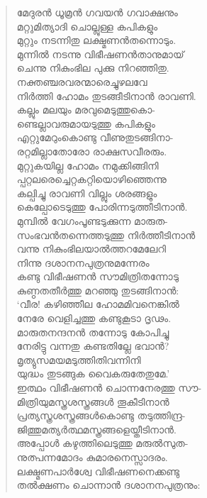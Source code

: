\begin{verse}
മേദുരന്‍ ധൂമ്രന്‍ ഗവയന്‍ ഗവാക്ഷനും\\
മറ്റുമിത്യാദി ചൊല്ലുള്ള കപികളും\\
മുറ്റും നടന്നിതു ലക്ഷ്മണന്‍തന്നൊടും.\\
മുന്നില്‍ നടന്നു വിഭീഷണന്‍താനുമായ്\\
ചെന്നു നികുംഭില പുക്കു നിറഞ്ഞിതു.\\
നക്തഞ്ചരവരന്മാരെച്ചുഴലവേ\\
നിര്‍ത്തി ഹോമം തുടങ്ങീടിനാന്‍ രാവണി.\\
കല്ലും മലയും മരവുമെടുത്തുകൊ-\\
ണ്ടെല്ലാവരുമായടുത്തു കപികളും\\
എറ്റുമേറുംകൊണ്ടു വീണുതുടങ്ങിനാ-\\
രറ്റമില്ലാതോരോ രാക്ഷസവീരരും.\\
മുറ്റുകയില്ല ഹോമം നമുക്കിങ്ങിനി\\
പ്പറ്റലരെച്ചെറ്റകറ്റിയൊഴിഞ്ഞെന്നു\\
കല്പിച്ചു രാവണി വില്ലും ശരങ്ങളും\\
കെല്പോടെടുത്തു പോരിന്നടുത്തീടിനാന്‍.\\
മുമ്പില്‍ വേഗംപൂണ്ടടുക്കുന്ന മാരുത-\\
സംഭവന്‍തന്നെത്തടുത്തു നിര്‍ത്തീടിനാന്‍\\
വന്നു നികുംഭിലയാല്‍ത്തറമേലേറി\\
നിന്നു ദശാനനപുത്രനുമന്നേരം\\
കണ്ടു വിഭീഷണന്‍ സൗമിത്രിതന്നോടു\\
കുണ്ഠതതീര്‍ത്തു മറഞ്ഞു തുടങ്ങിനാന്‍:\\
‘വീര! കഴിഞ്ഞീല ഹോമമിവനെങ്കില്‍\\
നേരേ വെളിച്ചത്തു കണ്ടുകൂടാ ദൃഢം.\\
മാരുതനന്ദനന്‍ തന്നോടു കോപിച്ചു\\
നേരിട്ടു വന്നതു കണ്ടതില്ലേ ഭവാന്‍?\\
മൃത്യുസമയമടുത്തിതിവന്നിനി\\
യുദ്ധം തുടങ്ങുക വൈകരുതേതുമേ.’\\
ഇത്ഥം വിഭീഷണന്‍ ചൊന്നനേരത്തു സൗ-\\
മിത്രിയുമസ്ത്രശസ്ത്രങ്ങള്‍ തൂകീടിനാന്‍\\
പ്രത്യസ്ത്രശസ്ത്രങ്ങള്‍കൊണ്ടു തടുത്തിന്ദ്ര-\\
ജിത്തുമത്യര്‍ത്ഥമസ്ത്രങ്ങളെയ്തീടിനാന്‍.\\
അപ്പോള്‍ കഴുത്തിലെടുത്തു മരുല്‍സുത-\\
നുത്പന്നമോദം കുമാരനെസ്സാദരം.\\
ലക്ഷ്മണപാര്‍ശ്വേ വിഭീഷണനെക്കണ്ടു\\
തല്‍ക്ഷണം ചൊന്നാന്‍ ദശാനനപുത്രനും:\\

\end{verse}

